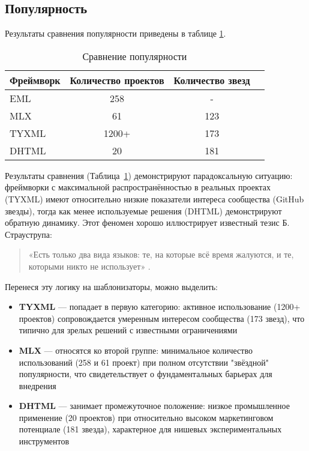 \subsection{Популярность}

Результаты сравнения популярности приведены в таблице \ref{tab:popularity-comparison}.

\begin{table}[h!]
    \centering
    \begin{tabular}{lccc}
        \toprule
        \textbf{Фреймворк} & \textbf{Количество проектов} & \textbf{Количество звезд} \\
        \midrule
        EML & 258 & - \\
        MLX & 61 & 123 \\
        TYXML & 1200+ & 173 \\
        DHTML & 20 & 181 \\
        \bottomrule
    \end{tabular}
    \caption{Сравнение популярности}
    \label{tab:popularity-comparison}
\end{table}

Результаты сравнения (Таблица~\ref{tab:popularity-comparison}) демонстрируют парадоксальную ситуацию: фреймворки с максимальной распространённостью в реальных проектах (TYXML) имеют относительно низкие показатели интереса сообщества (GitHub звезды), тогда как менее используемые решения (DHTML) демонстрируют обратную динамику.
Этот феномен хорошо иллюстрирует известный тезис Б. Страуструпа:
\begin{quote}
    «Есть только два вида языков: те, на которые всё время жалуются, и те, которыми никто не использует» \cite{two_kinds}.
\end{quote}

Перенеся эту логику на шаблонизаторы, можно выделить:
\begin{itemize}
    \item \textbf{TYXML} — попадает в первую категорию: активное использование (1200+ проектов) сопровождается умеренным интересом сообщества (173 звезд), что типично для зрелых решений с известными ограничениями
    \item \textbf{MLX} — относятся ко второй группе: минимальное количество использований (258 и 61 проект) при полном отсутствии "звёздной" популярности, что свидетельствует о фундаментальных барьерах для внедрения
    \item \textbf{DHTML} — занимает промежуточное положение: низкое промышленное применение (20 проектов) при относительно высоком маркетинговом потенциале (181 звезда), характерное для нишевых экспериментальных инструментов
\end{itemize}

